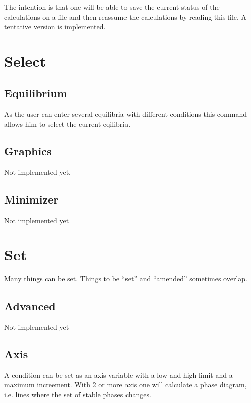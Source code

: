 \documentclass[12pt]{article}
\begin{document}
The intention is that one will be able to save the current status of
the calculations on a file and then reassume the calculations by
reading this file.  A tentative version is implemented.


\section{Select }

\subsection{Equilibrium}

As the user can enter several equilibria with different conditions
this command allows him to select the current eqilibria.

\subsection{Graphics}

Not implemented yet.

\subsection{Minimizer}

Not implemented yet

\section{Set }

Many things can be set.  Things to be ``set'' and ``amended''
sometimes overlap.

\subsection{Advanced}

Not implemented yet

\subsection{Axis}

A condition can be set as an axis variable with a low and high limit
and a maximum increement.  With 2 or more axis one will calculate a
phase diagram, i.e. lines where the set of stable phases changes.
\end{document}
